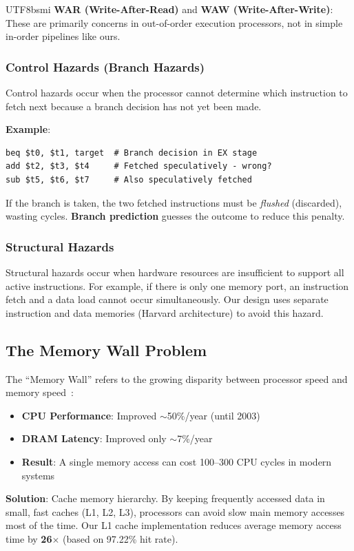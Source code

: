 \documentclass[journal,twoside]{IEEEtran}
\begin{document}
\begin{CJK}{UTF8}{bsmi}
\textbf{WAR (Write-After-Read)} and \textbf{WAW (Write-After-Write)}: These are primarily concerns in out-of-order execution processors, not in simple in-order pipelines like ours.

\subsubsection{Control Hazards (Branch Hazards)}
Control hazards occur when the processor cannot determine which instruction to fetch next because a branch decision has not yet been made.

\textbf{Example}:
\begin{lstlisting}
beq $t0, $t1, target  # Branch decision in EX stage
add $t2, $t3, $t4     # Fetched speculatively - wrong?
sub $t5, $t6, $t7     # Also speculatively fetched
\end{lstlisting}
If the branch is taken, the two fetched instructions must be \textit{flushed} (discarded), wasting cycles. \textbf{Branch prediction} guesses the outcome to reduce this penalty.

\subsubsection{Structural Hazards}
Structural hazards occur when hardware resources are insufficient to support all active instructions. For example, if there is only one memory port, an instruction fetch and a data load cannot occur simultaneously. Our design uses separate instruction and data memories (Harvard architecture) to avoid this hazard.

\subsection{The Memory Wall Problem}
The ``Memory Wall'' refers to the growing disparity between processor speed and memory speed~\cite{hennessy2017computer}:
\begin{itemize}
    \item \textbf{CPU Performance}: Improved $\sim$50\%/year (until 2003)
    \item \textbf{DRAM Latency}: Improved only $\sim$7\%/year
    \item \textbf{Result}: A single memory access can cost 100--300 CPU cycles in modern systems
\end{itemize}

\textbf{Solution}: Cache memory hierarchy. By keeping frequently accessed data in small, fast caches (L1, L2, L3), processors can avoid slow main memory accesses most of the time. Our L1 cache implementation reduces average memory access time by \textbf{26$\times$} (based on 97.22\% hit rate).


\end{CJK}
\end{document}
